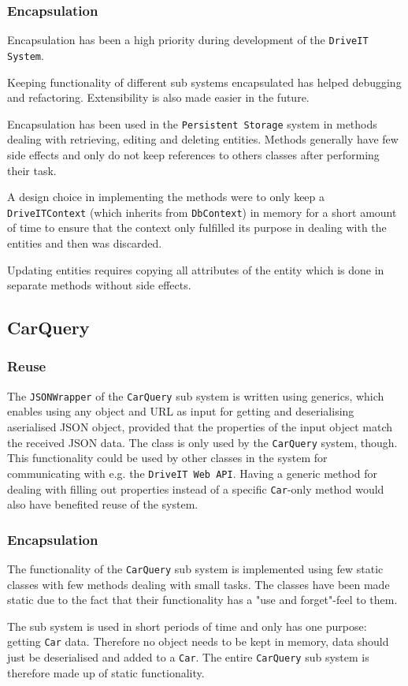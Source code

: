 \subsubsection{Encapsulation}
Encapsulation has been a high priority during development of the \texttt{DriveIT System}. 

Keeping functionality of different sub systems encapsulated has helped debugging and refactoring. Extensibility is also made easier in the future.

Encapsulation has been used in the \texttt{Persistent Storage} system in methods dealing with retrieving, editing and deleting entities. Methods generally have few side effects and only do not keep references to others classes after performing their task.

A design choice in implementing the methods were to only keep a \texttt{DriveITContext} (which inherits from \texttt{DbContext}) in memory for a short amount of time to ensure that the context only fulfilled its purpose in dealing with the entities and then was discarded.

Updating entities requires copying all attributes of the entity which is done in separate methods without side effects.

\subsection{CarQuery}

\subsubsection{Reuse}
The \texttt{JSONWrapper} of the \texttt{CarQuery} sub system is written using generics, which enables using any object and URL as input for getting and deserialising aserialised JSON object, provided that the properties of the input object match the received JSON data. 
The class is only used by the \texttt{CarQuery} system, though. This functionality could be used by other classes in the system for communicating with e.g. the \texttt{DriveIT Web API}. 
Having a generic method for dealing with filling out properties instead of a specific \texttt{Car}-only method would also have benefited reuse of the system.

\subsubsection{Encapsulation}
The functionality of the \texttt{CarQuery} sub system is implemented using few static classes with few methods dealing with small tasks. The classes have been made static due to the fact that their functionality has a "use and forget"-feel to them. 

The sub system is used in short periods of time and only has one purpose: getting \texttt{Car} data. Therefore no object needs to be kept in memory, data should just be deserialised and added to a \texttt{Car}. The entire \texttt{CarQuery} sub system is therefore made up of static functionality.
